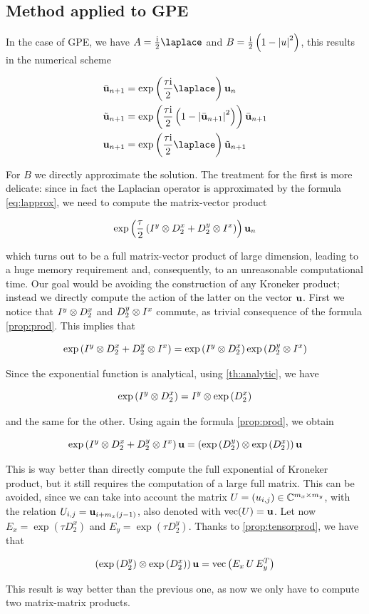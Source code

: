 \subsection{Method applied to GPE}

In the case of GPE, we have $A = \frac\ii2 \lap$ and $B = \frac{\mathrm{i}}2 \left(1 - \left| u \right|^2\right)$, this results in the numerical scheme 

\begin{align*}
    \bar{\uu}_{n+1} &= \exp\left(\frac{\tau\ii}{2} \lap\right) \uu_n \\
    \tilde{\uu}_{n+1} &= \exp\left(\frac{\tau\ii}{2} \left(1 - \abs{\bar{\uu}_{n+1}}^2\right)\right)\bar{\uu}_{n+1} \\
    \uu_{n+1} &= \exp\left(\frac{\tau\ii}{2} \lap\right) \tilde{\uu}_{n+1}
\end{align*}

For $B$ we directly approximate the solution. The treatment for the first is more delicate: since in fact the Laplacian operator is approximated by the formula \ref{eq:lapprox}, we need to compute the matrix-vector product 

\[
    \exp\left(\frac\tau2 \left(I^y \otimes D_2^x + D_2^y \otimes I^x\right)\right)\mathbf{u}_n
\]

which turns out to be a full matrix-vector product of large dimension, leading to a huge memory requirement and, consequently, to an unreasonable computational time. Our goal would be avoiding the construction of any Kroneker product; instead we directly compute the action of the latter on the vector $\mathbf{u}$. First we notice that $I^y \otimes D_2^x$ and $D_2^y \otimes I^x$ commute, as trivial consequence of the formula \ref{prop:prod}. This implies that 

\[ \exp\left(I^y \otimes D_2^x + D_2^y \otimes I^x\right) = \exp\left(I^y \otimes D_2^x\right)\exp\left(D_2^y \otimes I^x\right) \]

Since the exponential function is analytical, using \ref{th:analytic}, we have

\[ \exp\left(I^y \otimes D_2^x\right) = I^y \otimes \exp\left(D_2^x\right) \]

and the same for the other. Using again the formula \ref{prop:prod}, we obtain 

\[ \exp\left(I^y \otimes D_2^x + D_2^y \otimes I^x\right)\mathbf{u} = \left(\exp\left(D_2^y\right) \otimes \exp\left(D_2^x\right)\right)\mathbf{u} \]

This is way better than directly compute the full exponential of Kroneker product, but it still requires the computation of a large full matrix. This can be avoided, since we can take into account the matrix $U = (u_{i,j}) \in \mathbb{C}^{m_x \times m_y}$, with the relation $U_{i,j} = \mathbf{u}_{i + m_x(j - 1)}$, also denoted with $\mbox{vec}(U) = \mathbf{u}$. Let now $E_x = \exp\left(\tau D_2^x\right)$ and $E_y = \exp\left(\tau D_2^y\right)$. Thanks to \ref{prop:tensorprod}, we have that 

\[\left(\exp\left(D_2^y\right) \otimes \exp\left(D_2^x\right)\right)\mathbf{u} = \mathrm{vec}\left(E_x \, U \, E_y^T\right)\]

This result is way better than the previous one, as now we only have to compute two matrix-matrix products.

